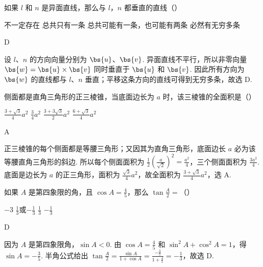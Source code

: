 \begin{problem}
如果 \(l\) 和 \(n\) 是异面直线，那么与 \(l\)，\(n\) 都垂直的直线（\quad）

\choices
    {不一定存在}
    {总共只有一条}
    {总共可能有一条，也可能有两条}
    {必然有无穷多条}
\end{problem}

\begin{answer}
D
\end{answer}

\begin{solution}
设 \(l\)、\(n\) 的方向向量分别为 \(\bs{u}\)、\(\bs{v}\). 异面直线不平行，所以非零向量 \(\bs{w}=\bs{u}\times\bs{v}\) 同时垂直于 \(\bs{u}\) 和 \(\bs{v}\). 因此所有方向为 \(\bs{w}\) 的直线都与 \(l\)、\(n\) 垂直；平移这条方向的直线可得到无穷多条，故选 D.
\end{solution}

\begin{problem}
侧面都是直角三角形的正三棱锥，当底面边长为 \(a\) 时，该三棱锥的全面积是（\quad）

\choices
    {\(\frac{3+\sqrt{3}}{4}a^2\)}
    {\(\frac{3}{4}a^2\)}
    {\(\frac{3+3\sqrt{3}}{2}a^2\)}
    {\(\frac{6+\sqrt{3}}{4}a^2\)}
\end{problem}

\begin{answer}
A
\end{answer}

\begin{solution}
正三棱锥的每个侧面都是等腰三角形；又因其为直角三角形，底面边长 \(a\) 必为该等腰直角三角形的斜边. 所以每个侧面面积为 \(\frac12\left(\frac a{\sqrt2}\right)^2=\frac{a^2}{4}\)，三个侧面面积为 \(\frac{3a^2}{4}\). 底面是边长为 \(a\) 的正三角形，面积为 \(\frac{\sqrt3}{4}a^2\)，故全面积为 \(\frac{3+\sqrt3}{4}a^2\)，选 A.
\end{solution}

\begin{problem}
如果 \(A\) 是第四象限的角，且 \(\cos A=\frac{4}{5}\)，那么 \(\tan \frac{A}{2}=\)（\quad）

\choices
    {\(-3\)}
    {\(\frac{1}{3}\)或\(-\frac{1}{3}\)}
    {\(\frac{1}{3}\)}
    {\(-\frac{1}{3}\)}
\end{problem}

\begin{answer}
D
\end{answer}

\begin{solution}
因为 \(A\) 是第四象限角，\(\sin A<0\). 由 \(\cos A=\frac45\) 和 \(\sin^2A+\cos^2A=1\)，得 \(\sin A=-\frac35\). 半角公式给出 \(\tan\frac A2=\frac{\sin A}{1+\cos A}=\frac{-\frac{3}{5}}{1+\frac{4}{5}}=-\frac13\)，故选 D.
\end{solution}

